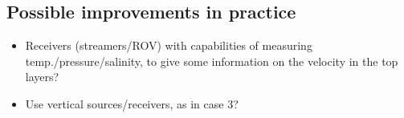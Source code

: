 \subsection{Possible improvements in practice}
\begin{itemize}
	\item Receivers (streamers/ROV) with capabilities of measuring temp./pressure/salinity, to give some information on the velocity in the top layers?
	\item Use vertical sources/receivers, as in case 3?
\end{itemize}

